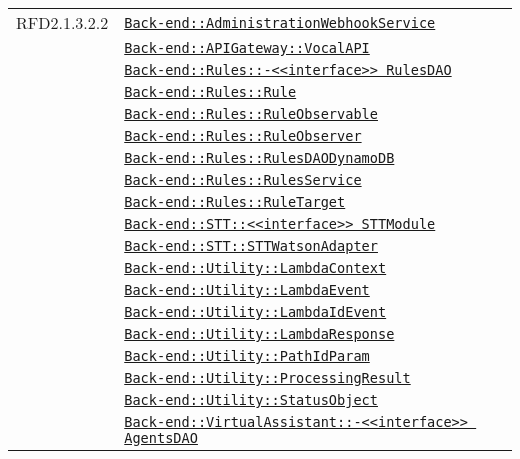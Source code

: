 \begin{longtable}{|>{\centering}m{3cm}|m{10cm}<{\centering}|}
RFD2.1.3.2.2 & \hyperref[Back-end::AdministrationWebhookService]{\texttt{Back-end::AdministrationWebhookService}}\\
& \hyperref[Back-end::APIGateway::VocalAPI]{\texttt{Back-end::APIGateway::VocalAPI}}\\
& \hyperref[Back-end::Rules::<<interface>> RulesDAO]{\texttt{Back-end::Rules::-\linebreak <<interface>> RulesDAO}}\\
& \hyperref[Back-end::Rules::Rule]{\texttt{Back-end::Rules::Rule}}\\
& \hyperref[Back-end::Rules::RuleObservable]{\texttt{Back-end::Rules::RuleObservable}}\\
& \hyperref[Back-end::Rules::RuleObserver]{\texttt{Back-end::Rules::RuleObserver}}\\
& \hyperref[Back-end::Rules::RulesDAODynamoDB]{\texttt{Back-end::Rules::RulesDAODynamoDB}}\\
& \hyperref[Back-end::Rules::RulesService]{\texttt{Back-end::Rules::RulesService}}\\
& \hyperref[Back-end::Rules::RuleTarget]{\texttt{Back-end::Rules::RuleTarget}}\\
& \hyperref[Back-end::STT::<<interface>> STTModule]{\texttt{Back-end::STT::<<interface>> STTModule}}\\
& \hyperref[Back-end::STT::STTWatsonAdapter]{\texttt{Back-end::STT::STTWatsonAdapter}}\\
& \hyperref[Back-end::Utility::LambdaContext]{\texttt{Back-end::Utility::LambdaContext}}\\
& \hyperref[Back-end::Utility::LambdaEvent]{\texttt{Back-end::Utility::LambdaEvent}}\\
& \hyperref[Back-end::Utility::LambdaIdEvent]{\texttt{Back-end::Utility::LambdaIdEvent}}\\
& \hyperref[Back-end::Utility::LambdaResponse]{\texttt{Back-end::Utility::LambdaResponse}}\\
& \hyperref[Back-end::Utility::PathIdParam]{\texttt{Back-end::Utility::PathIdParam}}\\
& \hyperref[Back-end::Utility::ProcessingResult]{\texttt{Back-end::Utility::ProcessingResult}}\\
& \hyperref[Back-end::Utility::StatusObject]{\texttt{Back-end::Utility::StatusObject}}\\
& \hyperref[Back-end::VirtualAssistant::<<interface>> AgentsDAO]{\texttt{Back-end::VirtualAssistant::-\linebreak <<interface>> AgentsDAO}}\\

\end{longtable}
